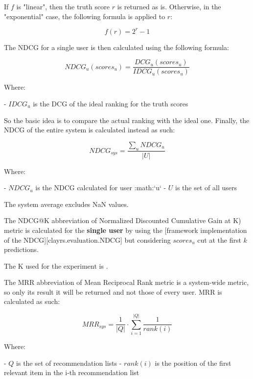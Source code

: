 \documentclass[11pt]{article}
\begin{document}
\hfill\break

If $f$ is "linear", then the truth score $r$ is returned as is. Otherwise, in the "exponential" case, the following
formula is applied to $r$:

    \[
    f(r) = 2^{r} - 1
    \]

\hfill\break

The NDCG for a single user is then calculated using the following formula:

    \[
    NDCG_u(scores_{u}) = \frac{DCG_{u}(scores_{u})}{IDCG_{u}(scores_{u})}
    \]

    Where:

    - $IDCG_{u}$ is the DCG of the ideal ranking for the truth scores

\hfill\break

So the basic idea is to compare the actual ranking with the ideal one.
Finally, the NDCG of the entire system is calculated instead as such:

    \[
    NDCG_{sys} = \frac{\sum_{u} NDCG_u}{|U|}
    \]

    Where:

    - $NDCG_u$ is the NDCG calculated for user :math:`u`
    - $U$ is the set of all users

\hfill\break

The system average excludes NaN values.



The NDCG@K abbreviation of Normalized Discounted Cumulative Gain at K) metric is calculated for the \textbf{single user}
by using the [framework implementation of the NDCG][clayrs.evaluation.NDCG] but considering $scores_{u}$ cut at the
first $k$ predictions.

The K used for the experiment is .


The MRR abbreviation of Mean Reciprocal Rank metric is a system-wide metric, so only its result it will be returned and not those
of every user. MRR is calculated as such:

    \[
    MRR_{sys} = \frac{1}{|Q|}\cdot\sum_{i=1}^{|Q|}\frac{1}{rank(i)}
    \]

    Where:

    - $Q$ is the set of recommendation lists
    - $rank(i)$ is the position of the first relevant item in the i-th recommendation list

\hfill\break
\end{document}
